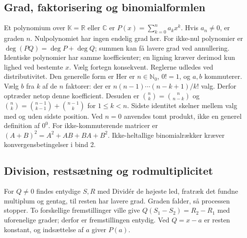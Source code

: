 \subsection{Grad, faktorisering og binomialformlen}
Et polynomium over $\mathbb K=\mathbb R$ eller $\mathbb C$ er
$P(x)=\sum_{k=0}^n a_kx^k$. Hvis $a_n\ne0$, er graden $n$.
Nulpolynomiet har ingen endelig grad her.
For ikke-nul polynomier er $\deg(PQ)=\deg P+\deg Q$;
summen kan få lavere grad ved annullering. Identiske polynomier har
samme koefficienter; en ligning kræver derimod kun lighed ved bestemte $x$.
Vælg fortegn konsekvent. Reglerne udledes ved distributivitet.
Den generelle form er
Her er $n\in\mathbb N_0$, $0!=1$, og $a,b$ kommuterer.
Vælg $b$ fra $k$ af de $n$ faktorer: der er
$n(n-1)\cdots(n-k+1)/k!$ valg. Derfor optræder netop denne koefficient.
Desuden er $\binom nk=\binom n{n-k}$ og
$\binom nk=\binom{n-1}{k-1}+\binom{n-1}k$ for $1\le k<n$.
Sidste identitet skelner mellem valg med og uden sidste position.
Ved $n=0$ anvendes tomt produkt, ikke en generel definition af $0^0$.
For ikke-kommuterende matricer er $(A+B)^2=A^2+AB+BA+B^2$.
Ikke-heltallige binomialrækker kræver konvergensbetingelser i bind 2.

\subsection{Division, restsætning og rodmultiplicitet}
For $Q\ne0$ findes entydige $S,R$ med
Dividér de højeste led, fratræk det fundne multiplum og gentag, til
resten har lavere grad. Graden falder, så processen stopper.
To forskellige fremstillinger ville give $Q(S_1-S_2)=R_2-R_1$ med
uforenelige grader; derfor er fremstillingen entydig. Ved $Q=x-a$
er resten konstant, og indsættelse af $a$ giver $P(a)$.

